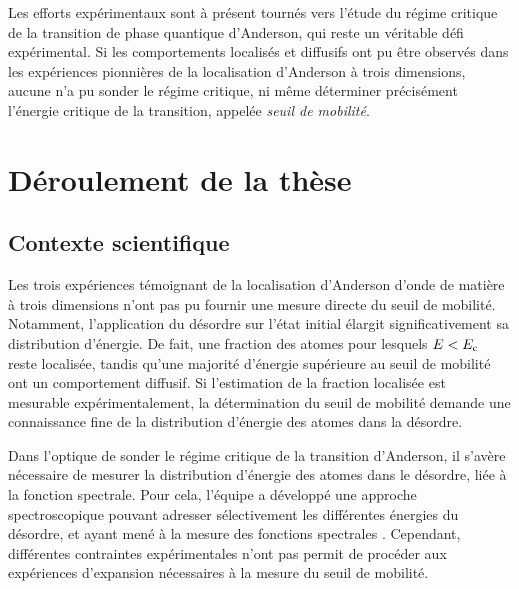 Les efforts expérimentaux sont à présent tournés vers l'étude du régime critique de la transition de phase quantique d'Anderson, qui reste un véritable défi expérimental. Si les comportements localisés et diffusifs ont pu être observés dans les expériences pionnières de la localisation d'Anderson à trois dimensions, aucune n'a pu sonder le régime critique, ni même déterminer précisément l'énergie critique de la transition, appelée \emph{seuil de mobilité}.




\section*{Déroulement de la thèse}

\subsection*{Contexte scientifique}
Les trois expériences témoignant de la localisation d'Anderson d'onde de matière à trois dimensions n'ont pas pu fournir une mesure directe du seuil de mobilité. Notamment, l'application du désordre sur l'état initial élargit significativement sa distribution d'énergie. De fait, une fraction des atomes pour lesquels $E<E_{\mathrm{c}}$ reste localisée, tandis qu'une majorité d'énergie supérieure au seuil de mobilité ont un comportement diffusif. Si l'estimation de la fraction localisée est mesurable expérimentalement, la détermination du seuil de mobilité demande une connaissance fine de la distribution d'énergie des atomes dans la désordre.

Dans l'optique de sonder le régime critique de la transition d'Anderson, il s'avère nécessaire de mesurer la distribution d'énergie des atomes dans le désordre, liée à la fonction spectrale\citep{pasek2017anderson}. Pour cela, l'équipe a développé une approche spectroscopique pouvant adresser sélectivement les différentes énergies du désordre, et ayant mené à la mesure des fonctions spectrales \citep{volchkov2018measurement}\citep{denechaud2018vers}. Cependant, différentes contraintes expérimentales n'ont pas permit de procéder aux expériences d'expansion nécessaires à la mesure du seuil de mobilité.

